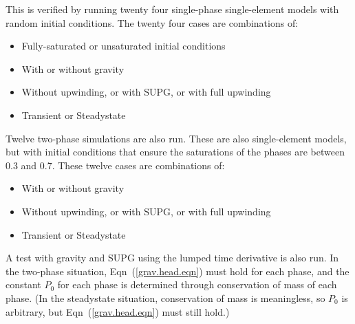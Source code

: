 \documentclass[]{scrreprt}
\begin{document}
This is verified by running twenty four single-phase single-element models
with random initial conditions.  The twenty four cases are combinations of:
\begin{itemize}
\item Fully-saturated or unsaturated initial conditions
\item With or without gravity
\item Without upwinding, or with SUPG, or with full upwinding
\item Transient or Steadystate
\end{itemize}
Twelve two-phase simulations are also run.  These are also
single-element models, but with initial conditions that ensure the
saturations of the phases are between 0.3 and 0.7.  These twelve cases
are combinations of:
\begin{itemize}
\item With or without gravity
\item Without upwinding, or with SUPG, or with full upwinding
\item Transient or Steadystate
\end{itemize}
A test with gravity and SUPG using the lumped time derivative is also run.
In the two-phase situation, Eqn~(\ref{grav.head.eqn}) must hold for
each phase, and the constant $P_{0}$ for each phase is determined
through conservation of mass of each phase.  (In the steadystate
situation, conservation of mass is meaningless, so $P_{0}$ is
arbitrary, but Eqn~(\ref{grav.head.eqn}) must still hold.)
\end{document}
